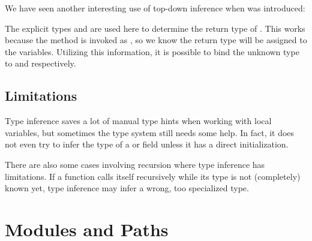 \documentclass{haxe}
\begin{document}
We have seen another interesting use of top-down inference when  was introduced:


The explicit types  and  are used here to determine the return type of . This works because the method is invoked as , so we know the return type will be assigned to the variables. Utilizing this information, it is possible to bind the unknown type  to  and  respectively.





\subsection{Limitations}
\label{type-system-inference-limitations}

Type inference saves a lot of manual type hints when working with local variables, but sometimes the type system still needs some help. In fact, it does not even try to infer the type of a  or  field unless it has a direct initialization.

There are also some cases involving recursion where type inference has limitations. If a function calls itself recursively while its type is not (completely) known yet, type inference may infer a wrong, too specialized type.




\section{Modules and Paths}
\label{type-system-modules-and-paths}

\end{document}
